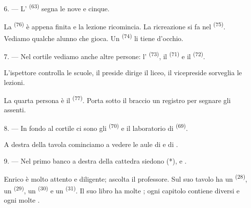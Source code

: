 \VUsaut{5.2mm}
\VUsaut{3.6mm}

6. --- L' \textsuperscript{(63)} segna le nove e cinque.

La  \textsuperscript{(76)} è appena finita e la lezione ricomincia.
La ricreazione si fa nel  \textsuperscript{(75)}. Vediamo qualche
alunno che gioca. Un  \textsuperscript{(74)} li tiene d'occhio.

7. --- Nel cortile vediamo anche altre persone: l'
\textsuperscript{(73)}, il  \textsuperscript{(71)} e il
 \textsuperscript{(72)}.

L'ispettore controlla le scuole, il preside dirige il liceo, il vicepreside
sorveglia le lezioni.

La quarta persona è il  \textsuperscript{(77)}. Porta sotto il
braccio un registro per segnare gli assenti.

8. --- In fondo al cortile ci sono gli 
\textsuperscript{(70)} e il laboratorio di 
\textsuperscript{(69)}.

A destra della tavola cominciamo a vedere le aule di  e di
.


\VUsaut{2.4mm}

\VUsaut{3.0mm}

9. --- Nel primo banco a destra della cattedra siedono  (*),
 e .

Enrico è molto attento e diligente; ascolta il professore. Sul suo tavolo ha un
 \textsuperscript{(28)}, un  \textsuperscript{(29)},
un  \textsuperscript{(30)} e un 
\textsuperscript{(31)}. Il suo libro ha molte ; ogni capitolo contiene
diversi  e ogni  molte .

